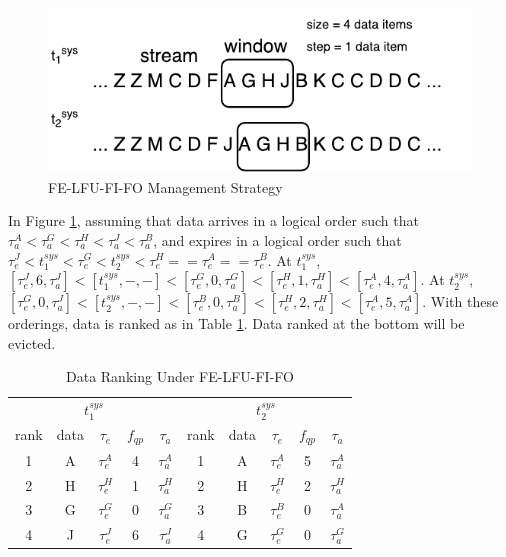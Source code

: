 \begin{figure}[!htbp]
	\centering
    \includegraphics[width=5in]{img/3-sifelfufifo.pdf}
    \caption{FE-LFU-FI-FO Management Strategy}
    \label{fig:3-sifelfufifo}
\end{figure}

In Figure \ref{fig:3-sifelfufifo}, assuming that data arrives in a logical order such that $\tau^{A}_{a} < \tau^{G}_{a} < \tau^{H}_{a} < \tau^{J}_{a} < \tau^{B}_{a}$, and expires in a logical order such that  $\tau^{J}_{e} < t^{sys}_{1} < \tau^{G}_{e} < t^{sys}_{2} < \tau^{H}_{e} == \tau^{A}_{e} == \tau^{B}_{e}$.
At $t^{sys}_{1}$, $[\tau^{J}_{e}, 6, \tau^{J}_{a}] < [t^{sys}_{1}, -, -] < [\tau^{G}_{e}, 0, \tau^{G}_{a}] < [\tau^{H}_{e}, 1, \tau^{H}_{a}] < [\tau^{A}_{e}, 4, \tau^{A}_{a}]$. 
At $t^{sys}_{2}$, $[\tau^{G}_{e}, 0, \tau^{J}_{a}] < [t^{sys}_{2}, -, -] < [\tau^{B}_{e}, 0, \tau^{B}_{a}] < [\tau^{H}_{e}, 2, \tau^{H}_{a}] < [\tau^{A}_{e}, 5, \tau^{A}_{a}]$. 
With these orderings, data is ranked as in Table \ref{tab:felfufifo}. 
Data ranked at the bottom will be evicted. 

\begin{table}[!htbp]
\centering
\caption{Data Ranking Under FE-LFU-FI-FO}
\label{tab:felfufifo}
\begin{tabular}{|c|c|c|c|c||c|c|c|c|c|}
\hline
\multicolumn{5}{|c||}{$t^{sys}_{1}$} & \multicolumn{5}{c|}{$t^{sys}_{2}$} \\ \hhline{|==========|}
rank & data & $\tau_{e}$ & $f_{qp}$ & $\tau_{a}$ & rank & data & $\tau_{e}$ & $f_{qp}$ & $\tau_{a}$ \\ \hhline{|=|=|=|=|=#=|=|=|=|=|}
1 & A & $\tau^{A}_{e}$ & 4 & $\tau^{A}_{a}$ & 1 & A & $\tau^{A}_{e}$ & 5 & $\tau^{A}_{a}$ \\ \hline
2 & H & $\tau^{H}_{e}$ & 1 & $\tau^{H}_{a}$ & 2 & H & $\tau^{H}_{e}$ & 2 & $\tau^{H}_{a}$ \\ \hline
3 & G & $\tau^{G}_{e}$ & 0 & $\tau^{G}_{a}$ & 3 & B & $\tau^{B}_{e}$ & 0 & $\tau^{A}_{a}$ \\ \hline
4 & J & $\tau^{J}_{e}$ & 6 & $\tau^{J}_{a}$ & 4 & G & $\tau^{G}_{e}$ & 0 & $\tau^{G}_{a}$ \\ \hline
\end{tabular}
\end{table}

